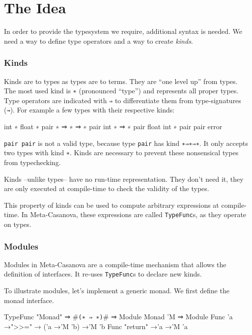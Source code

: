 \section{The Idea}
In order to provide the typesystem we require, additional syntax is needed.
We need a way to define type operators and a way to create \textit{kinds}.

\subsubsection*{Kinds}
Kinds are to types as types are to terms.\cite[Chapter~30]{Pierce02}
They are ``one level up'' from types.
The most used kind is \texttt{∗} (pronounced ``type'') and represents all proper types.
Type operators are indicated with \texttt{⇒} to differentiate them from type-signatures (\texttt{→}).
For example a few types with their respective kinds:
\begin{code}
  int             ∗
  float           ∗
  pair            ∗ ⇒ ∗ ⇒ ∗
  pair int        ∗ ⇒ ∗ 
  pair float int  ∗
  pair pair       error
\end{code}

\texttt{pair pair} is not a valid type, because type \texttt{pair} has kind \texttt{∗⇒∗⇒∗}.
It only accepts two types with kind \texttt{∗}.
Kinds are necessary to prevent these nonsensical types from typechecking.

Kinds --unlike types-- have no run-time representation.
They don't need it, they are only executed at compile-time to check the validity of the types.

This property of kinds can be used to compute arbitrary expressions at compile-time.
In Meta-Casanova, these expressions are called \texttt{TypeFunc}s, as they operate on types.

\subsubsection*{Modules}
Modules in Meta-Casanova are a compile-time mechanism that allows the definition of interfaces.
It re-uses \texttt{TypeFunc}s to declare new kinds.

To illustrate modules, let's implement a generic monad.
We first define the monad interface.

\begin{code}
  TypeFunc "Monad" ⇒ #\verb|(∗ ⇒ ∗)|# ⇒ Module
  Monad 'M ⇒ Module {
    Func 'a →">>=" → ('a →'M 'b) →'M 'b
    Func "return" →'a →'M 'a
  }
\end{code}

